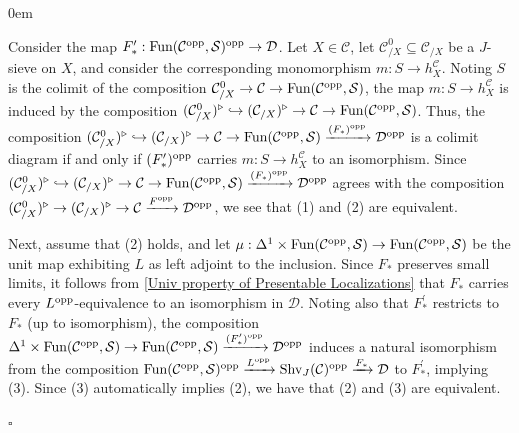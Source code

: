 \documentclass[10pt]{article}
\newcommand{\mS}{\mathcal S}
\newcommand{\C}{\mathcal C}
\newcommand{\cD}{\mathcal{D}}
\renewcommand{\qed}{\hfill$\square$}
\renewenvironment{proof}{\begin{addmargin}[1em]{0em}\begin{newproof}}{\end{newproof}\end{addmargin}\qed}
\theoremstyle{witharg}
\theoremstyle{witharg}
\theoremstyle{witharg2}
\begin{document}
\begin{proof}

Consider the map $F^\prime_*:\textnormal{Fun}(\C^{\textnormal{opp}},\mS)^{\textnormal{opp}}\rightarrow \cD$. Let $X\in \C$, let $\C^0_{/X}\subseteq \C_{/X}$ be a $J$-sieve on $X$, and consider the corresponding monomorphism $m:S\rightarrow h^\C_X$. Noting $S$ is the colimit of the composition $\C^0_{/X}\rightarrow \C\rightarrow \textnormal{Fun}(\C^{\textnormal{opp}},\mS)$, the map $m:S\rightarrow h^\C_X$ is induced by the composition $(\C^0_{/X})^\triangleright\hookrightarrow (\C_{/X})^\triangleright\rightarrow \C\rightarrow  \textnormal{Fun}(\C^{\textnormal{opp}},\mS)$. Thus, the composition $(\C^0_{/X})^\triangleright\hookrightarrow (\C_{/X})^\triangleright\rightarrow \C\rightarrow  \textnormal{Fun}(\C^{\textnormal{opp}},\mS)\xrightarrow{(F_*)^{\textnormal{opp}}}\cD^{\textnormal{opp}}$ is a colimit diagram if and only if $(F_*^\prime)^{\textnormal{opp}}$ carries $m:S\rightarrow h^\C_X$ to an isomorphism. Since $(\C^0_{/X})^\triangleright\hookrightarrow (\C_{/X})^\triangleright\rightarrow \C\rightarrow  \textnormal{Fun}(\C^{\textnormal{opp}},\mS)\xrightarrow{(F_*)^{\textnormal{opp}}}\cD^{\textnormal{opp}}$ agrees with the composition $(\C^0_{/X})^\triangleright\rightarrow (\C_{/X})^\triangleright\rightarrow \C\xrightarrow{F^{\textnormal{opp}}}\cD^{\textnormal{opp}}$, we see that (1) and (2) are equivalent. 

Next, assume that (2) holds, and let $\mu:\Delta^1\times \textnormal{Fun}(\C^{\textnormal{opp}},\mS)\rightarrow \textnormal{Fun}(\C^{\textnormal{opp}},\mS)$ be the unit map exhibiting $L$ as left adjoint to the inclusion. Since $F_*$ preserves small limits, it follows from \ref{Univ property of Presentable Localizations} that $F_*$ carries every $L^{\textnormal{opp}}$-equivalence to an isomorphism in $\cD$. Noting also that $F_*^\prime$ restricts to $F_*$ (up to isomorphism), the composition $\Delta^1\times \textnormal{Fun}(\C^{\textnormal{opp}},\mS)\rightarrow \textnormal{Fun}(\C^{\textnormal{opp}},\mS)\xrightarrow{(F^\prime_*)^{\textnormal{opp}}}\cD^{\textnormal{opp}}$ induces a natural isomorphism from the composition $\textnormal{Fun}(\C^{\textnormal{opp}},\mS)^{\textnormal{opp}}\xrightarrow{L^{\textnormal{opp}}}\textnormal{Shv}_J(\C)^{\textnormal{opp}}\xrightarrow{F_*}\cD$ to $F^\prime_*$, implying (3). Since (3) automatically implies (2), we have that (2) and (3) are equivalent. 


\end{proof}
\end{document}
